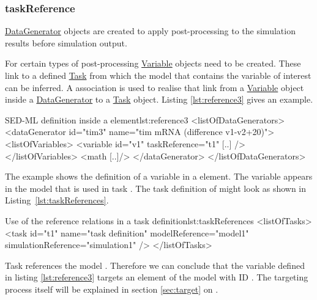 \subsubsection{taskReference}
\label{sec:taskReference}
\hyperref[class:dataGenerator]{DataGenerator} objects are created to apply post-processing to the simulation results before simulation output. 

For certain types of post-processing \hyperref[class:variable]{Variable} objects need to be created. These link to a defined \hyperref[class:task]{Task} from which the model that contains the variable of interest can be inferred. 
A  association is used to realise that link from a \hyperref[class:variable]{Variable} object inside a \hyperref[class:dataGenerator]{DataGenerator} to a \hyperref[class:task]{Task} object. 
Listing \ref{lst:reference3} gives an example.
%
\begin{myXmlLst}{SED-ML  definition inside a  element}{lst:reference3}
<listOfDataGenerators>
 <dataGenerator id="tim3" name="tim mRNA (difference v1-v2+20)">
  <listOfVariables>
   <variable id="v1" taskReference="t1" [..] />
  </listOfVariables>
  <math [..]/>
 </dataGenerator>
</listOfDataGenerators>
\end{myXmlLst}
%
The example shows the definition of a variable  in a  element. The variable appears in the model that is used in task . The task definition of  might look as shown in Listing~\ref{lst:taskReferences}.
\begin{myXmlLst}{Use of the reference relations in a task definition}{lst:taskReferences}
<listOfTasks>
  <task id="t1" name="task definition" modelReference="model1" simulationReference="simulation1" />
</listOfTasks>
\end{myXmlLst}
Task  references the model . Therefore we can conclude that the variable  defined in listing \ref{lst:reference3} targets an element of the model with ID . The targeting process itself will be explained in section \ref{sec:target} on .
